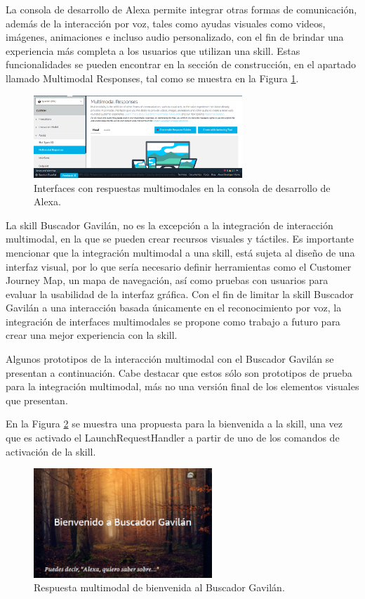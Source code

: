 La consola de desarrollo de Alexa permite integrar otras formas de comunicación, además de la interacción por voz, tales como ayudas visuales como videos, imágenes, animaciones e incluso audio personalizado, con el fin de brindar una experiencia más completa a los usuarios que utilizan una skill. Estas funcionalidades se pueden encontrar en la sección de construcción, en el apartado llamado Multimodal Responses, tal como se muestra en la Figura \ref{fig:51}.

\begin{figure}[H]
  \centering
  \includegraphics[width=0.70\textwidth]{Cap5/Figuras/AlexaMultimodalResponses.png}
  \caption{Interfaces con respuestas multimodales en la consola de desarrollo de Alexa.}
  \label{fig:51}
\end{figure}

La skill Buscador Gavilán, no es la excepción a la integración de interacción multimodal, en la que se pueden crear recursos visuales y táctiles. Es importante mencionar que la integración multimodal a una skill, está sujeta al diseño de una interfaz visual, por lo que sería necesario definir herramientas como el Customer Journey Map, un mapa de navegación, así como pruebas con usuarios para evaluar la usabilidad de la interfaz gráfica. Con el fin de limitar la skill Buscador Gavilán a una interacción basada únicamente en el reconocimiento por voz, la integración de interfaces multimodales se propone como trabajo a futuro para crear una mejor experiencia con la skill.

Algunos prototipos de la interacción multimodal con el Buscador Gavilán se presentan a continuación. Cabe destacar que estos sólo son prototipos de prueba para la integración multimodal, más no una versión final de los elementos visuales que presentan.

En la Figura \ref{fig:52} se muestra una propuesta para la bienvenida a la skill, una vez que es activado el LaunchRequestHandler a partir de uno de los comandos de activación de la skill.

\begin{figure}[H]
  \centering
  \includegraphics[width=0.60\textwidth]{Cap5/Figuras/Multimodal1.png}
  \caption{Respuesta multimodal de bienvenida al Buscador Gavilán.}
  \label{fig:52}
\end{figure}

